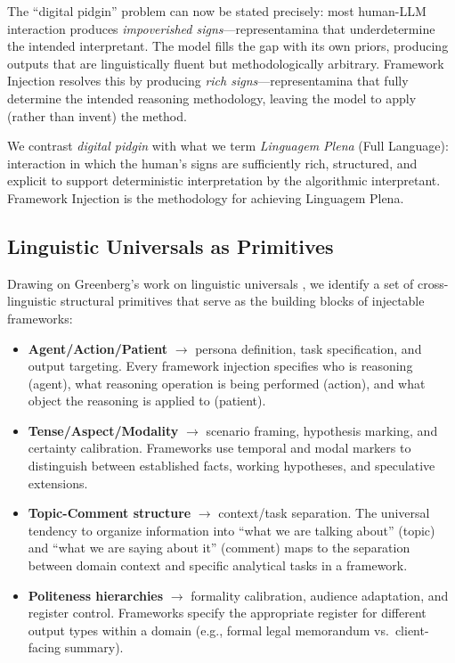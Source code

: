 \documentclass[12pt,a4paper]{article}
\begin{document}
The ``digital pidgin'' problem can now be stated precisely: most human-LLM interaction produces \emph{impoverished signs}---representamina that underdetermine the intended interpretant. The model fills the gap with its own priors, producing outputs that are linguistically fluent but methodologically arbitrary. Framework Injection resolves this by producing \emph{rich signs}---representamina that fully determine the intended reasoning methodology, leaving the model to apply (rather than invent) the method.

We contrast \emph{digital pidgin} with what we term \emph{Linguagem Plena} (Full Language): interaction in which the human's signs are sufficiently rich, structured, and explicit to support deterministic interpretation by the algorithmic interpretant. Framework Injection is the methodology for achieving Linguagem Plena.

\subsection{Linguistic Universals as Primitives}
\label{sec:definition:universals}

Drawing on Greenberg's work on linguistic universals \citep{greenberg1963universals}, we identify a set of cross-linguistic structural primitives that serve as the building blocks of injectable frameworks:

\begin{itemize}
    \item \textbf{Agent/Action/Patient} $\rightarrow$ persona definition, task specification, and output targeting. Every framework injection specifies who is reasoning (agent), what reasoning operation is being performed (action), and what object the reasoning is applied to (patient).

    \item \textbf{Tense/Aspect/Modality} $\rightarrow$ scenario framing, hypothesis marking, and certainty calibration. Frameworks use temporal and modal markers to distinguish between established facts, working hypotheses, and speculative extensions.

    \item \textbf{Topic-Comment structure} $\rightarrow$ context/task separation. The universal tendency to organize information into ``what we are talking about'' (topic) and ``what we are saying about it'' (comment) maps to the separation between domain context and specific analytical tasks in a framework.

    \item \textbf{Politeness hierarchies} $\rightarrow$ formality calibration, audience adaptation, and register control. Frameworks specify the appropriate register for different output types within a domain (e.g., formal legal memorandum vs.\ client-facing summary).
\end{itemize}
\end{document}

